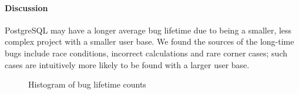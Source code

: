 \paragraph{Discussion}

PostgreSQL may have a longer average bug lifetime due to being a smaller, less
complex project with a smaller user base. We found the sources of the long-time
bugs include race conditions, incorrect calculations and rare corner cases; such
cases are intuitively more likely to be found with a larger user base.

\begin{figure}[tbh]
\centering
{}
\caption{\label{fig-bug-lifetime}Histogram of bug lifetime counts}
\end{figure}

